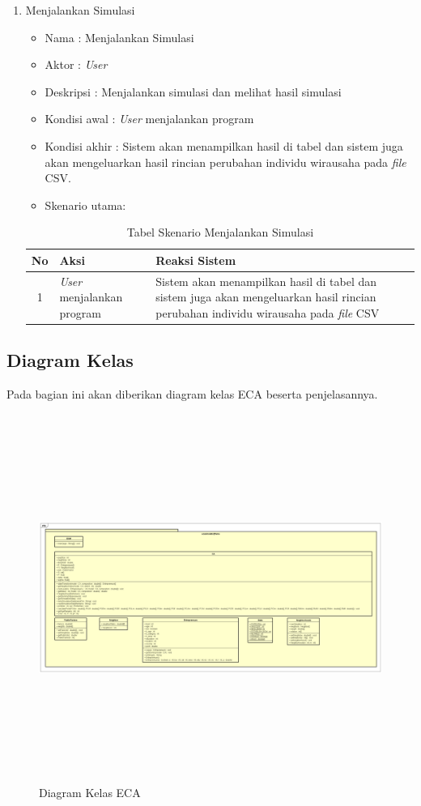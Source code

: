 \begin{enumerate}
	\item Menjalankan Simulasi
		\begin{itemize}
			\item Nama : Menjalankan Simulasi
			\item Aktor : \textit{User}
			\item Deskripsi : Menjalankan simulasi dan melihat hasil simulasi
			\item Kondisi awal : \textit{User} menjalankan program
			\item Kondisi akhir : Sistem akan menampilkan hasil di tabel dan sistem juga akan mengeluarkan hasil rincian perubahan individu wirausaha pada \textit{file} CSV.
			\item Skenario utama:
		\end{itemize}
		
\begin{table}[H]
\centering
\caption{Tabel Skenario Menjalankan Simulasi}
\begin{tabular}{|c|p{7cm}|p{7cm}|}
\hline
No & Aksi & Reaksi Sistem\\
\hline
1 & \textit{User} menjalankan program & Sistem akan menampilkan hasil di tabel dan sistem juga akan mengeluarkan hasil rincian perubahan individu wirausaha pada \textit{file} CSV \\
\hline
\end{tabular}
\label{tabelSkenario3}
\end{table}
		
\end{enumerate}


\subsection{Diagram Kelas}


Pada bagian ini akan diberikan diagram kelas ECA beserta penjelasannya.

	\begin{figure} [H]
		\centering  
		\includegraphics[width=18cm, height=12cm]{diagramKelas0} 
		\caption[Diagram Kelas ECA]{Diagram Kelas ECA} 
		\label{fig:CD1} 
	\end{figure}
	


